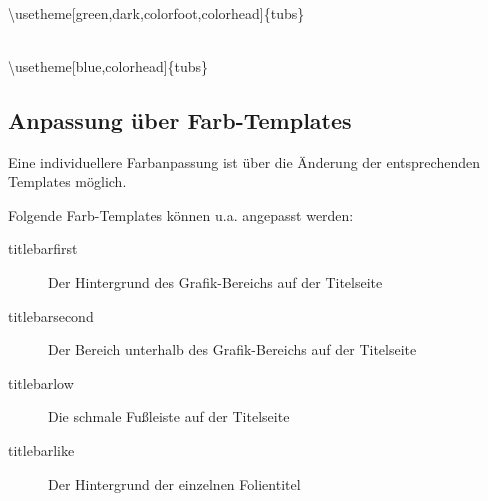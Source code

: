 \begin{center}
\begin{minipage}{0.49\textwidth}
\end{minipage}
\begin{minipage}{0.49\textwidth}
\end{minipage}\medskip\\
{\ttfamily \textbackslash usetheme[green,dark,colorfoot,colorhead]\{tubs\}}
\end{center}

\begin{center}
\begin{minipage}{0.49\textwidth}
\end{minipage}
\begin{minipage}{0.49\textwidth}
\end{minipage}\medskip\\
{\ttfamily%
  \textbackslash usetheme[blue,colorhead]\{tubs\}}
\end{center}

\clearpage
\subsection{Anpassung über Farb-Templates}

Eine individuellere Farbanpassung ist über die Änderung der entsprechenden
Templates möglich.

Folgende Farb-Templates können u.a. angepasst werden:
\begin{description}
  \item[\color{tuRed100}\ttfamily titlebarfirst]
    Der Hintergrund des Grafik-Bereichs auf der Titelseite
  \item[\color{tuRed100}\ttfamily titlebarsecond]
    Der Bereich unterhalb des Grafik-Bereichs auf der Titelseite
  \item[\color{tuRed100}\ttfamily titlebarlow]
    Die schmale Fußleiste auf der Titelseite
  \item[\color{tuRed100}\ttfamily titlebarlike]
    Der Hintergrund der einzelnen Folientitel
\end{description}

